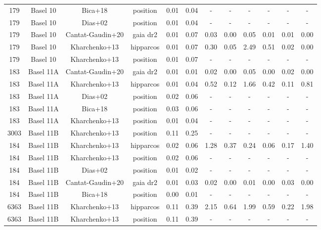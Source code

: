 \begin{table}
\begin{tabular}{*{12}{c}}
179 & Basel 10 & Bica+18 & position & 0.01 & 0.04 & - & - & - & - & - & -\\
179 & Basel 10 & Dias+02 & position & 0.01 & 0.04 & - & - & - & - & - & -\\
179 & Basel 10 & Cantat-Gaudin+20 & gaia dr2 & 0.01 & 0.07 & 0.03 & 0.00 & 0.05 & 0.01 & 0.01 & 0.00\\
179 & Basel 10 & Kharchenko+13 & hipparcos & 0.01 & 0.07 & 0.30 & 0.05 & 2.49 & 0.51 & 0.02 & 0.00\\
179 & Basel 10 & Kharchenko+13 & position & 0.01 & 0.07 & - & - & - & - & - & -\\
183 & Basel 11A & Cantat-Gaudin+20 & gaia dr2 & 0.01 & 0.01 & 0.02 & 0.00 & 0.05 & 0.00 & 0.02 & 0.00\\
183 & Basel 11A & Kharchenko+13 & hipparcos & 0.01 & 0.04 & 0.52 & 0.12 & 1.66 & 0.42 & 0.11 & 0.81\\
183 & Basel 11A & Dias+02 & position & 0.02 & 0.06 & - & - & - & - & - & -\\
183 & Basel 11A & Bica+18 & position & 0.03 & 0.06 & - & - & - & - & - & -\\
183 & Basel 11A & Kharchenko+13 & position & 0.01 & 0.04 & - & - & - & - & - & -\\
3003 & Basel 11B & Kharchenko+13 & position & 0.11 & 0.25 & - & - & - & - & - & -\\
184 & Basel 11B & Kharchenko+13 & hipparcos & 0.02 & 0.06 & 1.28 & 0.37 & 0.24 & 0.06 & 0.17 & 1.40\\
184 & Basel 11B & Kharchenko+13 & position & 0.02 & 0.06 & - & - & - & - & - & -\\
184 & Basel 11B & Dias+02 & position & 0.01 & 0.02 & - & - & - & - & - & -\\
184 & Basel 11B & Cantat-Gaudin+20 & gaia dr2 & 0.01 & 0.03 & 0.02 & 0.00 & 0.01 & 0.00 & 0.03 & 0.00\\
184 & Basel 11B & Bica+18 & position & 0.00 & 0.01 & - & - & - & - & - & -\\
6363 & Basel 11B & Kharchenko+13 & hipparcos & 0.11 & 0.39 & 2.15 & 0.64 & 1.99 & 0.59 & 0.22 & 1.98\\
6363 & Basel 11B & Kharchenko+13 & position & 0.11 & 0.39 & - & - & - & - & - & -\\

\end{tabular}
\end{table}
